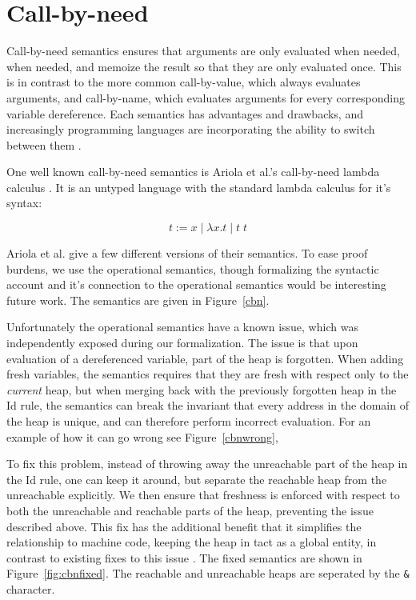 \section{Call-by-need}

Call-by-need semantics ensures that arguments are only evaluated when needed,
when needed, and memoize the result so that they are only evaluated once. This
is in contrast to the more common call-by-value, which always evaluates
arguments, and call-by-name, which evaluates arguments for every corresponding
variable dereference. Each semantics has advantages and drawbacks, and
increasingly programming languages are incorporating the ability to switch
between them \cite{?}. 

One well known call-by-need semantics is Ariola et al.'s call-by-need lambda
calculus \cite{?}. It is an untyped language with the standard lambda calculus
for it's syntax: 

  $$ t := x \; | \; \lambda x . t \; | \; t \; t $$

Ariola et al. give a few different versions of their semantics. To ease 
proof burdens, we use the operational semantics, though formalizing the
syntactic account and it's connection to the operational semantics would be
interesting future work. The semantics are given in Figure~\ref{cbn}. 

Unfortunately the operational semantics have a known issue, which was
independently exposed during our formalization. The issue is that upon
evaluation of a dereferenced variable, part of the heap is forgotten. When
adding fresh variables, the semantics requires that they are fresh with respect
only to the \emph{current} heap, but when merging back with the previously
forgotten heap in the Id rule, the semantics can break the invariant that every
address in the domain of the heap is unique, and can therefore perform incorrect
evaluation. For an example of how it can go wrong see Figure~\ref{cbnwrong}, 

To fix this problem, instead of throwing away the unreachable part of the heap
in the Id rule, one can keep it around, but separate the reachable heap from the
unreachable explicitly. We then ensure that freshness is enforced with respect
to both the unreachable and reachable parts of the heap, preventing the issue
described above. This fix has the additional benefit that it simplifies the
relationship to machine code, keeping the heap in tact as a global entity, in
contrast to existing fixes to this issue \cite{?}. The fixed semantics are shown
in Figure~\ref{fig:cbnfixed}. The reachable and unreachable heaps are seperated by
the \texttt{\&} character.

